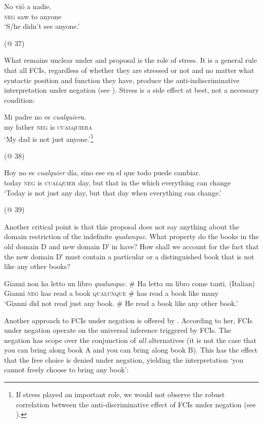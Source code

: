 \ea \label{ex:key:114} %
 \gll  No vió a nadie.\\
\textsc{neg} saw to anyone\\
  \glt ‘S/he didn’t see anyone.’

  (@ 37)
\z

What remains unclear under \citet{Fălăuş2013} and  proposal is the role of stress. It is a general rule that all FCIs, regardless of whether they are stressed or not and no matter what syntactic position and function they have, produce the anti-indiscriminative interpretation under negation (see ). Stress is a side effect at best, not a necessary condition:

\ea 
\label{bkm:Ref42806294} %
\gll Mi padre no es \textit{cualquiera}.\\
my father \textsc{neg} is \textsc{cualquiera}\\
\glt ‘My dad is not just anyone.’\footnote{If stress played an important role, we would not observe the robust correlation between the anti-discriminative effect of FCIs under negation (see ).} 

(@ 38)
\z


\ea \label{bkm:Ref42806303} %
  \gll Hoy no es \textit{cualquier} día, sino ese en el que todo puede cambiar.\\
today \textsc{neg} is \textsc{cualquier} day, but that in the which everything can change\\
  \glt ‘Today is not just any day, but that day when everything can change.’

  (@ 39)
\z

Another critical point is that this proposal does not say anything about the domain restriction of the indefinite \textit{qualunque}. What property do the books in the old domain D and new domain D′ in  have? How shall we account for the fact that the new domain D′ must contain a particular or a distinguished book that is not like any other books?

\ea \label{ex:key:117} %
\gll Gianni non ha letto un libro \textit{qualunque}. \# Ha letto un libro come tanti.  (Italian)\\
Gianni \textsc{neg} has read a book \textsc{qualunque} \# has read a book like many\\
  \glt ‘Gianni did not read just any book. \# He read a book like any other book.’
\z

Another approach to FCIs under negation is offered by \citet{Aloni2007}. According to her, FCIs under negation operate on the universal inference triggered by FCIs. The negation has scope over the conjunction of \textit{all} alternatives (it is not the case that you can bring along book A and you can bring along book B). This has the effect that the free choice is denied under negation, yielding the interpretation ‘you cannot freely choose to bring any book’:

